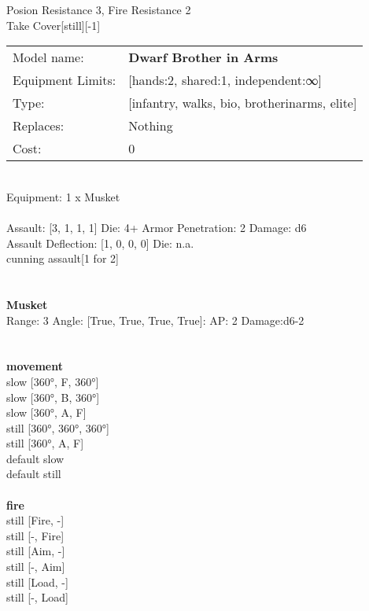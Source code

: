 \noindent Posion Resistance 3, Fire Resistance 2\\ 
Take Cover[still][-1]\\ 


\noindent
\begin{tabular}{ll}
Model name: &{\bf Dwarf Brother in Arms } \\
Equipment Limits: &[hands:2, shared:1, independent:∞] \\
Type: &[infantry, walks, bio, brotherinarms, elite] \\
Replaces: &Nothing \\
Cost: & 0\\
\end{tabular}
\ \\
Equipment: 1 x Musket \\
\ \\
Assault: [3, 1, 1, 1] Die: 4+ Armor Penetration: 2 Damage: d6 \\
Assault Deflection: [1, 0, 0, 0] Die: n.a.\\
\indent cunning assault[1 for 2]\\ 
 
\ \\

\ \\
{\bf Musket } \\



Range: 3  Angle: [True, True, True, True]: AP: 2 Damage:d6-2 \\




 
\ \\



\ \\ {\bf movement } \\
slow [360°, F, 360°] \\
slow [360°, B, 360°] \\
slow [360°, A, F] \\
still [360°, 360°, 360°] \\
still [360°, A, F] \\
default slow \\
default still \\
\ \\ {\bf fire } \\
still [Fire, -] \\
still [-, Fire] \\
still [Aim, -] \\
still [-, Aim] \\
still [Load, -] \\
still [-, Load] \\


